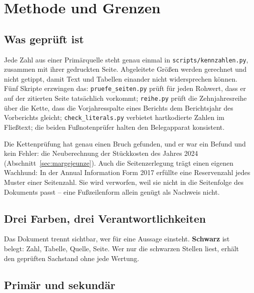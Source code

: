 \section*{Methode und Grenzen}

\subsection*{Was gepr\"uft ist}

Jede Zahl aus einer Prim\"arquelle steht genau einmal in
\texttt{scripts/kennzahlen.py}, zusammen mit ihrer gedruckten Seite.
Abgeleitete Gr\"o{\ss}en werden gerechnet und nicht getippt, damit Text und
Tabellen einander nicht widersprechen k\"onnen. F\"unf Skripte erzwingen das:
\texttt{pruefe\_seiten.py} pr\"uft f\"ur jeden Rohwert, dass er auf der
zitierten Seite tats\"achlich vorkommt; \texttt{reihe.py} pr\"uft die
Zehnjahresreihe \"uber die Kette, dass die Vorjahresspalte eines Berichts dem
Berichtsjahr des Vorberichts gleicht; \texttt{check\_literals.py} verbietet
hartkodierte Zahlen im Flie{\ss}text; die beiden Fu{\ss}notenpr\"ufer halten
den Belegapparat konsistent.

Die Kettenpr\"ufung hat genau einen Bruch gefunden, und er war ein Befund und
kein Fehler: die Neuberechnung der St\"uckkosten des Jahres 2024
(Abschnitt~\ref{sec:margejeunze}). Auch die Seitenzerlegung tr\"agt einen
eigenen Wachhund: In der Annual Information Form 2017 erf\"ullte eine
Reservenzahl jedes Muster einer Seitenzahl. Sie wird verworfen, weil sie nicht
in die Seitenfolge des Dokuments passt -- eine Fu{\ss}zeilenform allein
gen\"ugt als Nachweis nicht.

\subsection*{Drei Farben, drei Verantwortlichkeiten}

Das Dokument trennt sichtbar, wer f\"ur eine Aussage einsteht.
\textbf{Schwarz} ist belegt: Zahl, Tabelle, Quelle, Seite.   Wer nur die schwarzen Stellen
liest, erh\"alt den gepr\"uften Sachstand ohne jede Wertung.

\subsection*{Prim\"ar und sekund\"ar}

